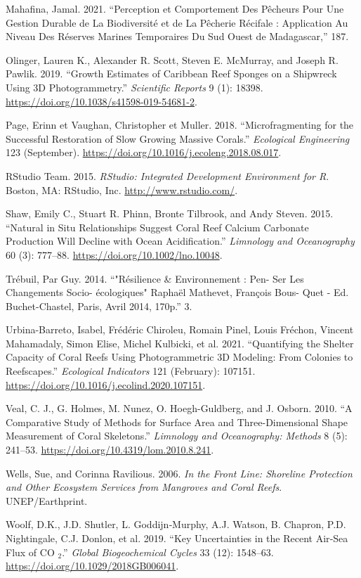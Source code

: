 \documentclass[]{article}
\begin{document}
\leavevmode\hypertarget{ref-mahafina_perception_2021}{}%
Mahafina, Jamal. 2021. ``Perception et Comportement Des Pêcheurs Pour
Une Gestion Durable de La Biodiversité et de La Pêcherie Récifale :
Application Au Niveau Des Réserves Marines Temporaires Du Sud Ouest de
Madagascar,'' 187.

\leavevmode\hypertarget{ref-olinger_growth_2019}{}%
Olinger, Lauren K., Alexander R. Scott, Steven E. McMurray, and Joseph
R. Pawlik. 2019. ``Growth Estimates of Caribbean Reef Sponges on a
Shipwreck Using 3D Photogrammetry.'' \emph{Scientific Reports} 9 (1):
18398. \url{https://doi.org/10.1038/s41598-019-54681-2}.

\leavevmode\hypertarget{ref-page_microfragmenting_2018}{}%
Page, Erinn et Vaughan, Christopher et Muller. 2018. ``Microfragmenting
for the Successful Restoration of Slow Growing Massive Corals.''
\emph{Ecological Engineering} 123 (September).
\url{https://doi.org/10.1016/j.ecoleng.2018.08.017}.

\leavevmode\hypertarget{ref-rstudio}{}%
RStudio Team. 2015. \emph{RStudio: Integrated Development Environment
for R}. Boston, MA: RStudio, Inc. \url{http://www.rstudio.com/}.

\leavevmode\hypertarget{ref-shaw_natural_2015}{}%
Shaw, Emily C., Stuart R. Phinn, Bronte Tilbrook, and Andy Steven. 2015.
``Natural in Situ Relationships Suggest Coral Reef Calcium Carbonate
Production Will Decline with Ocean Acidification.'' \emph{Limnology and
Oceanography} 60 (3): 777--88. \url{https://doi.org/10.1002/lno.10048}.

\leavevmode\hypertarget{ref-trebuil_resilience_2014}{}%
Trébuil, Par Guy. 2014. ``"Résilience \& Environnement : Pen- Ser Les
Changements Socio- écologiques" Raphaël Mathevet, François Bous- Quet -
Ed. Buchet-Chastel, Paris, Avril 2014, 170p.'' 3.

\leavevmode\hypertarget{ref-urbina-barreto_quantifying_2021}{}%
Urbina-Barreto, Isabel, Frédéric Chiroleu, Romain Pinel, Louis Fréchon,
Vincent Mahamadaly, Simon Elise, Michel Kulbicki, et al. 2021.
``Quantifying the Shelter Capacity of Coral Reefs Using Photogrammetric
3D Modeling: From Colonies to Reefscapes.'' \emph{Ecological Indicators}
121 (February): 107151.
\url{https://doi.org/10.1016/j.ecolind.2020.107151}.

\leavevmode\hypertarget{ref-veal_comparative_2010}{}%
Veal, C. J., G. Holmes, M. Nunez, O. Hoegh-Guldberg, and J. Osborn.
2010. ``A Comparative Study of Methods for Surface Area and
Three-Dimensional Shape Measurement of Coral Skeletons.''
\emph{Limnology and Oceanography: Methods} 8 (5): 241--53.
\url{https://doi.org/10.4319/lom.2010.8.241}.

\leavevmode\hypertarget{ref-wells_front_2006}{}%
Wells, Sue, and Corinna Ravilious. 2006. \emph{In the Front Line:
Shoreline Protection and Other Ecosystem Services from Mangroves and
Coral Reefs}. UNEP/Earthprint.

\leavevmode\hypertarget{ref-woolf_key_2019}{}%
Woolf, D.K., J.D. Shutler, L. Goddijn‐Murphy, A.J. Watson, B. Chapron,
P.D. Nightingale, C.J. Donlon, et al. 2019. ``Key Uncertainties in the
Recent Air‐Sea Flux of CO \(_{\textrm{2}}\).'' \emph{Global
Biogeochemical Cycles} 33 (12): 1548--63.
\url{https://doi.org/10.1029/2018GB006041}.
\end{document}
